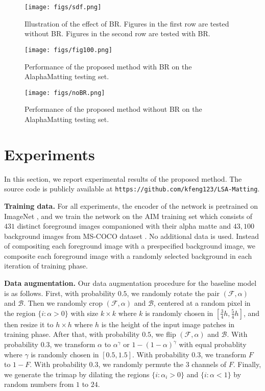 \documentclass{article}
\theoremstyle{plain}
\begin{document}
\begin{figure*}[t]
  \centering
  \texttt{[image: figs/sdf.png]}
  \caption{Illustration of the effect of BR.
      Figures in the first row are tested without BR.
      Figures in the second row are tested with BR.
  }
  \label{fig:666}
\end{figure*}

\begin{figure*}[t]
  \centering
  \texttt{[image: figs/fig100.png]}
  \caption{Performance of the proposed method with BR on the AlaphaMatting testing set.}
  \label{fig:100}
\end{figure*}

\begin{figure*}[t]
  \centering
  \texttt{[image: figs/noBR.png]}
  \caption{Performance of the proposed method without BR on the AlaphaMatting testing set.}
  \label{fig:101}
\end{figure*}


\section{Experiments}
In this section, we report experimental results of the proposed method.
The source code is publicly available at 
\texttt{https://github.com/kfeng123/LSA-Matting}.


\textbf{Training data.}
For all experiments,
the encoder of the network is pretrained on ImageNet \cite{Deng2009ImageNet},
and we train the network on the AIM training set \cite{Xu2017DeepImageMatting} which consists of $431$ distinct foreground images companioned with their alpha matte and
$43,100$ background images from MS-COCO dataset \cite{Lin2014MS-COCO}.
No additional data is used.
Instead of compositing each foreground image with a prespecified background image, we composite each foreground image with a randomly selected background in each iteration of training phase.


\textbf{Data augmentation.}
Our data augmentation procedure for the baseline model is as follows.
First, with probability $0.5$, we randomly rotate the pair $(\mathcal F, \alpha)$ and $\mathcal B$.
Then we randomly crop $(\mathcal F, \alpha)$ and $\mathcal B$, centered at a random pixel in the region $\{i: \alpha > 0\}$ with size $k \times k$ where $k$ is randomly chosen in $[\frac{3}{4} h, \frac{5}{4} h]$, and then resize it to $h \times h$ where $h$ is the height of the input image patches in training phase.
After that, with probability $0.5$, we flip $(\mathcal F, \alpha)$ and $\mathcal B$.
With probability $0.3$, we transform $\alpha$ to
$\alpha^{\gamma}$ or $1- (1- \alpha)^\gamma$ with equal probablity where $\gamma$ is randomly chosen in $[0.5, 1.5]$.
With probability $0.3$, we transform $F$ to $1-F$.
With probability $0.3$, we randomly permute the $3$ channels of $F$.
Finally, we generate the trimap by dilating the regions $\{i:\alpha_i > 0\}$ and $\{i: \alpha <1\}$ by random numbers from $1$ to $24$.
\end{document}

